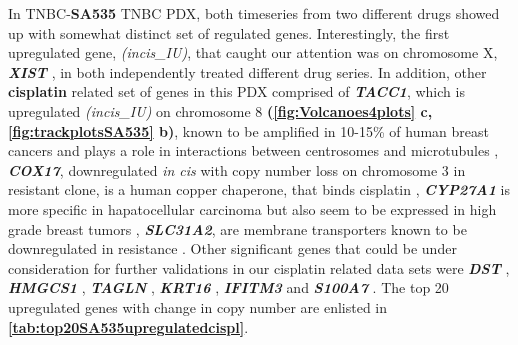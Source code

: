 In TNBC-\textbf{SA535} TNBC PDX, both timeseries from two different drugs showed up with somewhat distinct set of regulated genes. Interestingly, the first upregulated gene, \textit{(incis\_IU)}, that caught our attention was on chromosome X, \textit{\textbf{XIST}} \cite{salama2020xist,chen2017long, chen2019up}, in both independently treated different drug series. 
In addition, other \textbf{cisplatin} related set of genes in this PDX comprised of \textit{\textbf{TACC1}}, which is upregulated \textit{(incis\_IU)} on chromosome 8 \textbf{(\autoref{fig:Volcanoes4plots} c, \autoref{fig:trackplotsSA535} b)}, known to be amplified in 10-15\% of human breast cancers and plays a role in interactions between centrosomes and microtubules \cite{ray2004genomic, gergely2000tacc, shakya2018high},
 \textit{\textbf{COX17}}, downregulated \textit{in cis} with copy number loss on chromosome 3 in resistant clone, is a human copper chaperone, that binds cisplatin \cite{katano2002acquisition, zhao2014cisplatin}, \textit{\textbf{CYP27A1} }is more specific in hapatocellular carcinoma but also seem to be expressed in high grade breast tumors \cite{liang2019cyp27a1, wu201327}, \textit{\textbf{SLC31A2}}, are membrane transporters known to be downregulated in resistance \cite{bai2017structural}. Other significant genes that could be under consideration for further validations in our cisplatin related data sets were \textit{\textbf{DST} } \cite{salerno2016human,lee2012differentially}, \textit{\textbf{HMGCS1}} \cite{walsh2020mevalonate},
\textit{\textbf{TAGLN}} \cite{wu2014transgelin, elsafadi2020transgelin},
\textit{\textbf{KRT16}} \cite{huang2019novel},
\textit{\textbf{IFITM3}} \cite{liu2019ifitm3} and
\textit{\textbf{S100A7}} \cite{zhang2019clinical, mayama2018olfm}. The top 20 upregulated genes with change in copy number are enlisted in \textbf{\autoref{tab:top20SA535upregulatedcispl}}.


